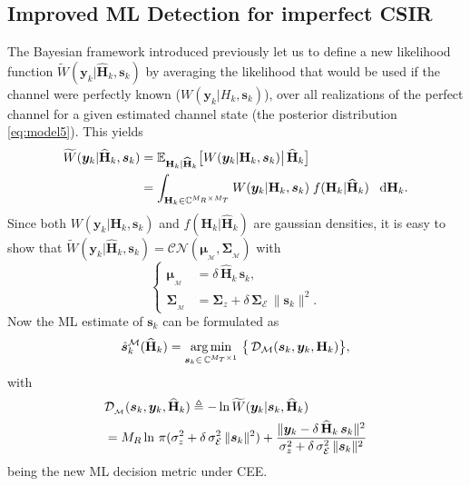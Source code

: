 \documentclass{article}
\def\cro#1{\left[#1\right]}                \def\stdcro#1{[#1]}
\def\bigcro#1{\bigl[#1\bigr]}              \def\biggcro#1{\biggl[#1\biggr]}
\def\esp{{\mathrm{E}}\,}              \def\Esp#1{{\mathrm{E}}\bigcro{#1}}  \def\Esph#1#2{\underset{{#1}}{\mathrm{E}}\bigcro{#2}}               \def\Espold#1{{\mathrm{E}}\cro{#1}}
\def\W{,\thickspace}
\def\H{{\mathbf H}}
\def\HH{\widehat{{\mathbf H}}}
\def\y{{\bm y }}
\def\s{{\bm s }}
\def\W{{ W}}
\def\WT{{\widetilde{ W}}}
\def\esp{{\mathbb E}}
\def\sig{\mathbf \Sigma}
\begin{document}
\subsection{Improved ML Detection for imperfect CSIR}
\label{subsec:mod}
The Bayesian framework introduced previously let us to define a new likelihood function $\WT(\y_k|\HH_k,\s_k)$ by averaging the likelihood that would be used if the channel were perfectly known ($W(\y_k|H_k,\s_k)$), over all realizations of the perfect channel for a given estimated channel state (the posterior distribution \eqref{eq:model5}). This yields
\begin{align}
	\label{eq:metric4}
             \WT(\y_k|\HH_k,\s_k) &= \esp_{\H_k | \HH_k} \big[ \W(\y_k|\H_k,\s_k) \big | \, \HH_k \big] \notag \\
             &= \int_{\H_k \in \mathbb{C}^{M_R \times M_T}} \W(\y_k|\H_k,\s_k) \; f(\H_k|\HH_k) \;\;\; {\rm d}\H_k.
\end{align}
Since both $\W(\y_k|\H_k,\s_k)$ and $f(\H_k|\HH_k)$ are gaussian densities, it is easy to show that
$\WT(\y_k|\HH_k,\s_k) = \mathcal{CN}(\boldsymbol{\mu}_{_\mathcal{M}},\sig_{_\mathcal{M}})$                              with \cite{sadough06}
\begin{equation}
  \label{eq:metric5}
  \left\{\begin{array}{ll}
       \boldsymbol{\mu}_{_\mathcal{M}} &= \delta \, \HH_k \, \s_k, \\
       \sig_{_\mathcal{M}} &= \sig_z  + \delta \, \sig_{\mathcal{E}} \, \| \s_k \|^2.
    \end{array} \right.
\end{equation}
Now the ML estimate of $\s_k$ can be formulated as
\begin{equation}
\label{eq:metric6}
  \hat{\s}_k^{\mathcal{M}}(\HH_k)= \argmin_{\s_k \in \, \mathbb{C}^{M_T \times 1}}\, \big \{ \,\mathcal{D}_{\mathcal{M}}(\s_k,\y_k,\H_k) \big \},
\end{equation}
with
\begin{align}
\label{eq:metric7}
& \mathcal{D}_{_\mathcal{M}}(\s_k,\y_k,\HH_k) \triangleq - \ln \WT(\y_k|\s_k,\HH_k) \notag \\
&= M_R \ln \, \pi (\sigma^2_z + \delta \, \sigma^2_\mathcal{E}\, \|\s_k\|^2)+ \frac{\|\y_k-\delta\,\HH_k\,\s_k\|^2}{\sigma^2_z+\delta\,\sigma^2_\mathcal{E}\,\|\s_k\|^2}
\end{align}
being the new ML decision metric under CEE.
\end{document}
